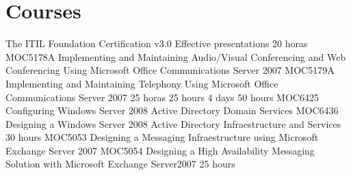 \documentclass[11pt,a4paper]{moderncv}
\begin{document}
\section{Courses}
 {\scriptsize{
The ITIL Foundation Certification v3.0\newline
Effective presentations}}
 {20 horas}{\scriptsize{
MOC5178A Implementing and Maintaining Audio/Visual Conferencing and Web Conferencing Using Microsoft Office Communications Server 2007\newline
MOC5179A Implementing and Maintaining Telephony Using Microsoft Office Communications Server 2007}}
 {25 horas}{}
 {25 hours}{}
 {4 days}{}
 {50 hours}{\scriptsize{
MOC6425 Configuring Windows Server 2008 Active Directory Domain Services\newline
MOC6436 Designing a Windows Server 2008 Active Directory Infraestructure and Services}}
 {30 hours}{\scriptsize{
MOC5053 Designing a Messaging Infraestructure using Microsoft Exchange Server 2007\newline
MOC5054 Designing a High Availability Messaging Solution with Microsoft Exchange Server2007}}
 {25 hours}{}

\end{document}
